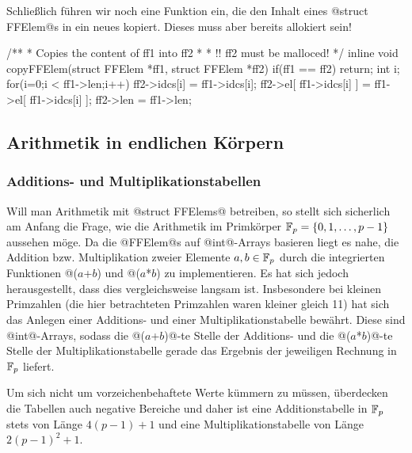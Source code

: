 Schließlich führen wir noch eine Funktion ein, die den Inhalt eines
@struct FFElem@s in ein neues kopiert. Dieses muss aber bereits allokiert sein!


\begin{ccode}[caption={Aus \url{../Sage/enumeratePCNs.c}}]
/**
 * Copies the content of ff1 into ff2
 *
 * !! ff2 must be malloced!
 */
inline void copyFFElem(struct FFElem *ff1, struct FFElem *ff2){
    if(ff1 == ff2) return;
    int i;
    for(i=0;i < ff1->len;i++){
        ff2->idcs[i] = ff1->idcs[i];
        ff2->el[ ff1->idcs[i] ] = ff1->el[ ff1->idcs[i] ];
    }
    ff2->len = ff1->len;
}
\end{ccode}

\subsection{Arithmetik in endlichen Körpern}
\label{sub:arithmetik_in_endlichen_körpern}


\subsubsection{Additions- und Multiplikationstabellen}
Will man Arithmetik mit @struct FFElems@ betreiben, so stellt sich sicherlich
am Anfang die Frage, wie die Arithmetik im Primkörper 
$\mathbb{F}_p = \{0,1,\ldots,p-1\}$
aussehen möge. Da
die @FFElem@s auf @int@-Arrays basieren liegt es nahe, die Addition bzw.
Multiplikation zweier Elemente $a,b\in \mathbb{F}_p$ durch die integrierten Funktionen
@($a$+$b$) %
und @($a$*$b$) %
zu implementieren. Es hat sich jedoch herausgestellt, dass dies vergleichsweise
langsam ist. Insbesondere bei kleinen Primzahlen 
(die hier betrachteten Primzahlen waren kleiner gleich 11) 
hat sich das Anlegen einer
Additions- und einer Multiplikationstabelle bewährt. Diese sind @int@-Arrays,
sodass die @($a$+$b$)@-te Stelle der Additions- und die 
@($a$*$b$)@-te Stelle der Multiplikationstabelle gerade das Ergebnis der
jeweiligen Rechnung in $\mathbb{F}_p$ liefert.

\begin{bemerkung}
  Um sich nicht um vorzeichenbehaftete Werte kümmern zu müssen, überdecken die
  Tabellen auch negative Bereiche und daher ist eine Additionstabelle in $\mathbb{F}_p$
  stets von Länge $4(p-1)+1$ und eine Multiplikationstabelle von
  Länge $2(p-1)^2+1$.
\end{bemerkung}

